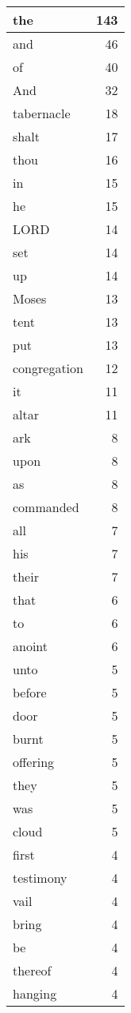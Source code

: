 \begin{center}
\begin{longtable}{l|r}
\hline \hline
\endlastfoot
the & 143 \\ \hline
and & 46 \\ \hline
of & 40 \\ \hline
And & 32 \\ \hline
tabernacle & 18 \\ \hline
shalt & 17 \\ \hline
thou & 16 \\ \hline
in & 15 \\ \hline
he & 15 \\ \hline
LORD & 14 \\ \hline
set & 14 \\ \hline
up & 14 \\ \hline
Moses & 13 \\ \hline
tent & 13 \\ \hline
put & 13 \\ \hline
congregation & 12 \\ \hline
it & 11 \\ \hline
altar & 11 \\ \hline
ark & 8 \\ \hline
upon & 8 \\ \hline
as & 8 \\ \hline
commanded & 8 \\ \hline
all & 7 \\ \hline
his & 7 \\ \hline
their & 7 \\ \hline
that & 6 \\ \hline
to & 6 \\ \hline
anoint & 6 \\ \hline
unto & 5 \\ \hline
before & 5 \\ \hline
door & 5 \\ \hline
burnt & 5 \\ \hline
offering & 5 \\ \hline
they & 5 \\ \hline
was & 5 \\ \hline
cloud & 5 \\ \hline
first & 4 \\ \hline
testimony & 4 \\ \hline
vail & 4 \\ \hline
bring & 4 \\ \hline
be & 4 \\ \hline
thereof & 4 \\ \hline
hanging & 4 \\ \hline

\end{longtable}
\end{center}
